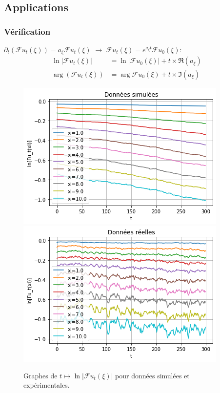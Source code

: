 \documentclass{beamer}
\newcommand{\pth}[1]{\left(#1\right)}
\newcommand{\abs}[1]{\left|#1\right|}
\newcommand{\dr}{\partial}
\newcommand{\fr}{\mathcal{F}}
\begin{document}
\subsection{Applications}


\begin{frame}
  \frametitle{Vérification}
  $\dr_t(\fr u_t(\xi))=a_{\xi}\fr u_t(\xi)$ $\to$ $\fr u_t(\xi)=e^{a_{\xi}t}\fr u_0(\xi)$:
\begin{align*}
  \ln\abs{\fr u_t(\xi)}&=\ln\abs{\fr u_0(\xi)}+t\times\Re(a_{\xi})\\
  \arg\pth{\fr u_t(\xi)}&=\arg{\fr u_0(\xi)}+t\times\Im(a_{\xi})
\end{align*}
\pause

\vspace{0.3cm}
\begin{figure}
  
\includegraphics[scale=0.4]{img/proj_non_norm_sim}
\includegraphics[scale=0.4]{img/proj_non_norm_rea}
  \caption{Graphes de $t\mapsto \ln\abs{\fr u_t(\xi)}$ pour données simulées et expérimentales.}
  
\end{figure}


\end{frame}
\end{document}
